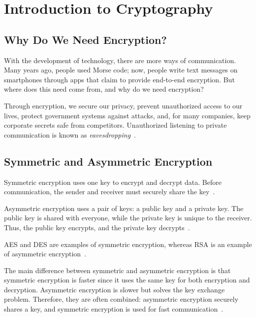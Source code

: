 \section{Introduction to Cryptography}

\subsection{Why Do We Need Encryption?}

With the development of technology, there are more ways of communication. Many years ago, people used Morse code; now, people write text messages on smartphones through apps that claim to provide end-to-end encryption. But where does this need come from, and why do we need encryption?

Through encryption, we secure our privacy, prevent unauthorized access to our lives, protect government systems against attacks, and, for many companies, keep corporate secrets safe from competitors. Unauthorized listening to private communication is known as \textit{eavesdropping}~\cite{Paar2024}.

\subsection{Symmetric and Asymmetric Encryption}

Symmetric encryption uses one key to encrypt and decrypt data. Before communication, the sender and receiver must securely share the key~\cite{Paar2024}.

Asymmetric encryption uses a pair of keys: a public key and a private key. The public key is shared with everyone, while the private key is unique to the receiver. Thus, the public key encrypts, and the private key decrypts~\cite{Paar2024}.

AES and DES are examples of symmetric encryption, whereas RSA is an example of asymmetric encryption~\cite{Paar2024}.

The main difference between symmetric and asymmetric encryption is that symmetric encryption is faster since it uses the same key for both encryption and decryption. Asymmetric encryption is slower but solves the key exchange problem. Therefore, they are often combined: asymmetric encryption securely shares a key, and symmetric encryption is used for fast communication~\cite{Paar2024}.